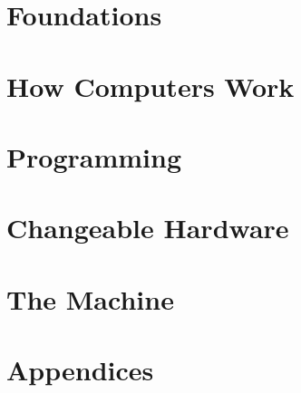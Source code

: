 \documentclass[10pt,twoside,openright]{book}
\begin{document}
\part{Foundations}




\part{How Computers Work}







\part{Programming}





\part{Changeable Hardware}





\part{The Machine}



\appendix
\part{Appendices}








\end{document}
